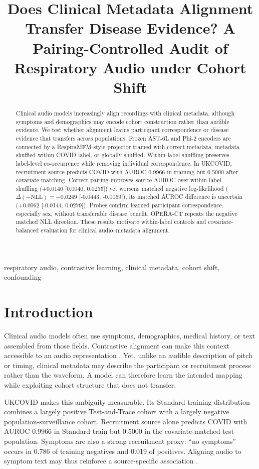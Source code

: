 \documentclass{article}
\title{Does Clinical Metadata Alignment Transfer Disease Evidence? A
Pairing-Controlled Audit of Respiratory Audio under Cohort Shift}
\newcommand{\deltanll}{\Delta(-\mathrm{NLL})}
\begin{document}
\ninept
\maketitle

\begin{abstract}
Clinical audio models increasingly align recordings with clinical metadata, although
symptoms and demographics may encode cohort construction rather than audible evidence. We
test whether alignment learns participant correspondence or disease evidence that transfers
across populations. Frozen AST-6L and Phi-2 encoders are connected by a RespiraMFM-style
projector trained with correct metadata, metadata shuffled within COVID label, or globally
shuffled. Within-label shuffling preserves label-level co-occurrence while removing
individual correspondence. In UKCOVID, recruitment source predicts COVID with AUROC 0.9966
in training but 0.5000 after covariate matching. Correct pairing improves source AUROC over
within-label shuffling (+0.0140 [0.0040, 0.0235]) yet worsens matched negative
log-likelihood ($\deltanll=-0.0249$ [-0.0443, -0.0069]); its matched AUROC difference is
uncertain (+0.0062 [-0.0144, 0.0279]). Probes confirm learned participant correspondence,
especially sex, without transferable disease benefit. OPERA-CT repeats the negative
matched NLL direction. These results motivate within-label controls and covariate-balanced
evaluation for clinical audio--metadata alignment.
\end{abstract}

\begin{keywords}
respiratory audio, contrastive learning, clinical metadata, cohort shift, confounding
\end{keywords}

\section{Introduction}
Clinical audio models often use symptoms, demographics, medical history, or text assembled
from those fields. Contrastive alignment can make this context accessible to an audio
representation \cite{siam2026respiramfm}. Yet, unlike an audible description of pitch or
timing, clinical metadata may describe the participant or recruitment process rather than
the waveform. A model can therefore learn the intended mapping while exploiting cohort
structure that does not transfer.

UKCOVID makes this ambiguity measurable. Its Standard training distribution combines a
largely positive Test-and-Trace cohort with a largely negative population-surveillance
cohort. Recruitment source alone predicts COVID with AUROC 0.9966 in Standard train but
0.5000 in the covariate-matched test population. Symptoms are also a strong recruitment
proxy: ``no symptoms'' occurs in 0.786 of training negatives and 0.019 of positives.
Aligning audio to symptom text may thus reinforce a source-specific association
\cite{coppock2024audio}.
\end{document}
